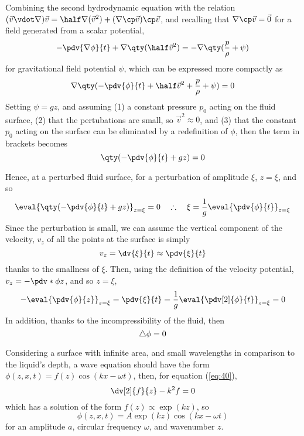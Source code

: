 Combining the second hydrodynamic equation with the relation $(\vec{v} \vdot \nabla) \vec{v} = \half \nabla (\vec{v}^2) + (\nabla \cp \vec{v}) \cp \vec{v}$, and recalling that $\nabla \cp \vec{v} = \vec{0}$ for a field generated from a scalar potential,
\begin{equation}
  \label{eq:37}
  - \pdv{\nabla \phi}{t} + \nabla \qty( \half \vec{v}^2 ) = - \nabla \qty( \frac{p}{\rho} + \psi)
\end{equation}
for gravitational field potential $\psi$, which can be expressed more compactly as
\begin{equation}
  \label{eq:38}
  \nabla \qty( - \pdv{\phi}{t} + \half \vec{v}^2 + \frac{p}{\rho} + \psi) = 0
\end{equation}
Setting $\psi = g z$, and assuming (1) a constant pressure $p_0$
acting on the fluid surface, (2) that the pertubations are small, so
$\vec{v}^2 \approx 0$, and (3) that the constant $p_0$ acting on the
surface can be eliminated by a redefinition of $\phi$, then the term
in brackets becomes 
\[ \qty( - \pdv{\phi}{t} + gz ) = 0 \]

Hence, at a perturbed fluid surface, for a perturbation of amplitude
$\xi$, $z = \xi$, and so
\begin{equation*}
  \label{eq:39}
  \eval{\qty( - \pdv{\phi}{t} + gz )}_{z = \xi} = 0 \quad\therefore\quad \xi = \frac{1}{g} \eval{\pdv{\phi}{t}}_{z=\xi}
\end{equation*}
Since the perturbation is small, we can assume the vertical component of the velocity, $v_z$ of all the points at the surface is simply
\[ v_z = \dv{\xi}{t} \approx \pdv{\xi}{t} \] thanks to the smallness
of $\xi$. Then, using the definition of the velocity potential, $v_z = - \pdv*{\phi}{z}$, and so $z = \xi$,
\begin{equation} 
\label{eq:18}
- \eval{\pdv{\phi}{z}}_{z = \xi} = \pdv{\xi}{t} = \frac{1}{g} \eval{\pdv[2]{\phi}{t}}_{z=\xi} = 0
\end{equation}
In addition, thanks to the incompressibility of the fluid, then 
\begin{equation} 
\label{eq:40}
\bigtriangleup{\phi} = 0
\end{equation}

Considering a surface with infinite area, and small wavelengths in
comparison to the liquid's depth, a wave equation should have the form
$\phi(z,x,t) = f(z) \cos(kx - \omega t)$, then, for equation
(\ref{eq:40}), 
\begin{equation}
  \label{eq:41}
  \dv[2]{f}{z} - k^2 f = 0
\end{equation}
which has a solution of the form $f(z) \propto \exp(k z)$, so
\begin{equation}
  \label{eq:42}
  \phi(z,x,t)=A \exp(kz) \cos(kx - \omega t)
\end{equation}
for an amplitude $a$, circular frequency $\omega$, and wavenumber $z$.

